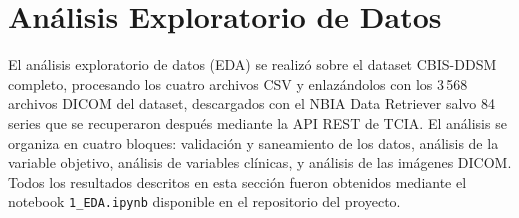 
\newpage
\section{Análisis Exploratorio de Datos}
\label{sec:eda}

El análisis exploratorio de datos (EDA) se realizó sobre
el dataset CBIS-DDSM completo, procesando los cuatro
archivos CSV y enlazándolos con los 3\,568 archivos DICOM
del dataset, descargados con el NBIA Data Retriever salvo
84 series que se recuperaron después mediante la API REST
de TCIA. El análisis se organiza en cuatro bloques:
validación y saneamiento de los datos, análisis de la
variable objetivo, análisis de variables clínicas, y
análisis de las imágenes DICOM. Todos los resultados
descritos en esta sección fueron obtenidos mediante el
notebook \texttt{1\_EDA.ipynb} disponible en el
repositorio del proyecto.
